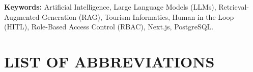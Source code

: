 \documentclass[12pt,a4paper]{report}
\begin{document}
\vspace{0.8cm}
\noindent \textbf{Keywords:} Artificial Intelligence, Large Language Models (LLMs), Retrieval-Augmented Generation (RAG), Tourism Informatics, Human-in-the-Loop (HITL), Role-Based Access Control (RBAC), Next.js, PostgreSQL.

\newpage

\tableofcontents
\newpage

\listoffigures
\newpage

\listoftables
\newpage

\chapter*{LIST OF ABBREVIATIONS}
\end{document}
